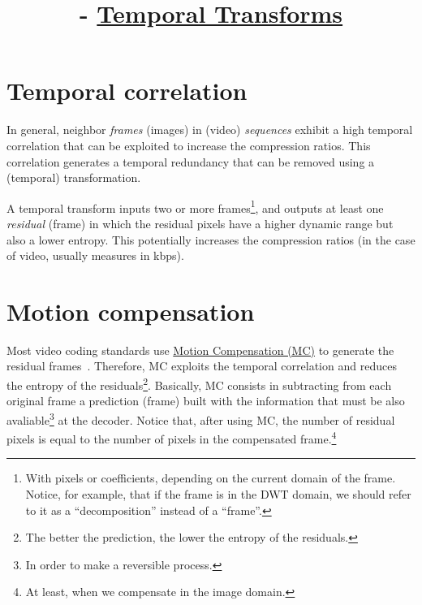 


\title{\SM{} - \href{https://github.com/Sistemas-Multimedia/Sistemas-Multimedia.github.io/tree/master/contents/temporal_transforms}{Temporal Transforms}}

\maketitle
\tableofcontents

\section{Temporal correlation}

In general, neighbor \emph{frames} (images) in (video)
\emph{sequences} exhibit a high temporal correlation that can be
exploited to increase the compression ratios. This correlation
generates a temporal redundancy that can be removed using a (temporal)
transformation.

A temporal transform inputs two or more frames\footnote{With pixels or
  coefficients, depending on the current domain of the frame. Notice,
  for example, that if the frame is in the DWT domain, we should refer
  to it as a ``decomposition'' instead of a ``frame''.}, and
outputs at least one \emph{residual} (frame) in which the residual
pixels have a higher dynamic range but also a lower entropy. This
potentially increases the compression ratios (in the case of video,
usually measures in kbps).


\section{Motion compensation}

Most video coding standards use
\href{https://en.wikipedia.org/wiki/Motion_compensation}{Motion
  Compensation (MC)} to generate the residual
frames~\cite{vruiz__MC}. Therefore, MC exploits the temporal
correlation and reduces the entropy of the residuals\footnote{The
  better the prediction, the lower the entropy of the
  residuals.}. Basically, MC consists in subtracting from each original
frame a prediction (frame) built with the information that must be
also avaliable\footnote{In order to make a reversible process.} at the
decoder. Notice that, after using MC, the number of residual pixels is
equal to the number of pixels in the compensated frame.\footnote{At
  least, when we compensate in the image domain.}

